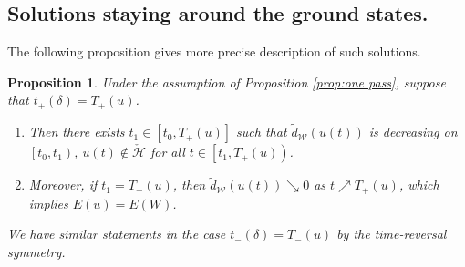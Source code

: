 \documentclass[reqno, 11pt]{amsart}
\numberwithin{equation}{section}
\theoremstyle{plain}
\newtheorem{proposition}[theorem]{Proposition}
\theoremstyle{definition}
\numberwithin{equation}{section}
\numberwithin{theorem}{section}
\numberwithin{equation}{section}
\numberwithin{equation}{section}
\numberwithin{theorem}{section}
\begin{document}
	\subsection{Solutions staying around the ground states.} The following proposition gives more precise description of such solutions.
	\begin{proposition}\label{prop:ps des} Under the assumption of Proposition \ref{prop:one pass}, suppose that $t_{+}(\delta)=T_{+}(u)$.
		\begin{enumerate}
			\item[$(1)$] Then there exists $t_{1}\in \left[ t_0,T_{+}(u) \right]$ such that $\widetilde{d}_{\mathcal{W}}(u(t))$ is decreasing on $\left[t_0,t_1\right)$, $u(t)\notin \check{\mathcal{H}}$ for all $t\in \left[ t_1,T_{+}(u) \right)$.
			\item[$(2)$] Moreover, if $t_1=T_{+}(u)$, then $\widetilde{d}_{\mathcal{W}}(u(t))\searrow0$ as $t\nearrow T_{+}(u)$, which implies $E(u)=E(W)$. 
		\end{enumerate}	
		We have similar statements in the case $t_{-}(\delta)=T_{-}(u)$ by the time-reversal symmetry.
	\end{proposition}
\end{document}
